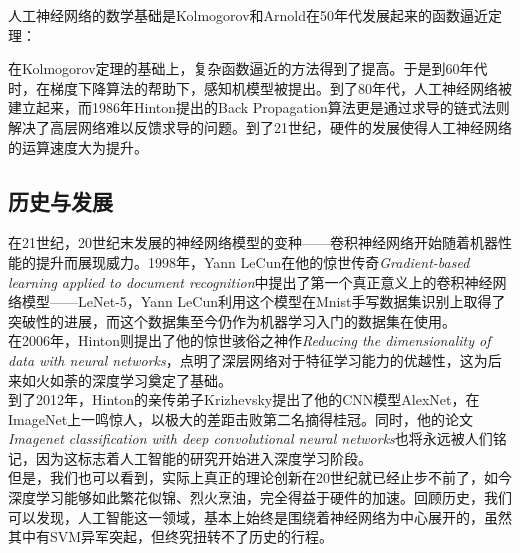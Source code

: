 \documentclass{article}
\begin{document}
人工神经网络的数学基础是Kolmogorov和Arnold在50年代发展起来的函数逼近定理：\\

\noindent
{}

\bigskip

在Kolmogorov定理的基础上，复杂函数逼近的方法得到了提高。于是到60年代时，在梯度下降算法的帮助下，感知机模型被提出。到了80年代，人工神经网络被建立起来，而1986年Hinton提出的Back Propagation算法更是通过求导的链式法则解决了高层网络难以反馈求导的问题。到了21世纪，硬件的发展使得人工神经网络的运算速度大为提升。

\subsection{历史与发展}

在21世纪，20世纪末发展的神经网络模型的变种——卷积神经网络开始随着机器性能的提升而展现威力。1998年，Yann LeCun在他的惊世传奇\emph{Gradient-based learning applied to document recognition}中提出了第一个真正意义上的卷积神经网络模型——LeNet-5，Yann LeCun利用这个模型在Mnist手写数据集识别上取得了突破性的进展，而这个数据集至今仍作为机器学习入门的数据集在使用。\\

在2006年，Hinton则提出了他的惊世骇俗之神作\emph{Reducing the dimensionality of data with neural networks}，点明了深层网络对于特征学习能力的优越性，这为后来如火如荼的深度学习奠定了基础。\\

到了2012年，Hinton的亲传弟子Krizhevsky提出了他的CNN模型AlexNet，在ImageNet上一鸣惊人，以极大的差距击败第二名摘得桂冠。同时，他的论文\emph{Imagenet classification with deep convolutional neural networks}也将永远被人们铭记，因为这标志着人工智能的研究开始进入深度学习阶段。\\

但是，我们也可以看到，实际上真正的理论创新在20世纪就已经止步不前了，如今深度学习能够如此繁花似锦、烈火烹油，完全得益于硬件的加速。回顾历史，我们可以发现，人工智能这一领域，基本上始终是围绕着神经网络为中心展开的，虽然其中有SVM异军突起，但终究扭转不了历史的行程。
\end{document}
